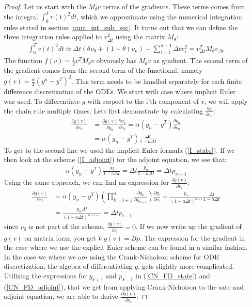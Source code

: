 \begin{proof}
Let us start with the $M_{\theta}v$ terms of the gradients. These terms comes from the integral $\int_0^T v(t)^2dt$, which we approximate using the numerical integration rules stated in section \ref{num_int_sub_sec}. It turns out that we can define the three integration rules applied to $v_{\Delta t}^2$ using the matrix $M_{\theta}$:
\begin{align*}
\int_0^T v(t)^2dt\approx  \Delta t(\theta v_0 +(1-\theta)v_n) + \sum_{i=1}^{n-1} \Delta t v_i^2 = v_{\Delta t}^TM_{\theta} v_{\Delta t}
\end{align*} 
The function $f(v)=\frac{1}{2} v^TM_{\theta}v$ obviously has $M_{\theta}v$ as gradient. The second term of the gradient comes from the second term of the functional, namely $g(v)=\frac{\alpha}{2}(y^n -y^T)^2$. This term needs to be handled separately for each finite difference discretization of the ODEs. We start with case where implicit Euler was used. To differentiate $g$ with respect to the i'th component of $v$, we will apply the chain rule multiple times. Lets first demonstrate by calculating $\frac{\partial g}{\partial v_n}$:
\begin{align*}
\frac{\partial g(v)}{\partial v_n} &= \frac{\partial g(v)}{\partial y_n}\frac{\partial y_n}{\partial v_n} = \alpha(y_n -y^T)\frac{\partial y_n}{\partial v_n}\\
&= \alpha(y_n -y^T)\frac{\Delta t}{1-a\Delta t}
\end{align*}
To get to the second line we used the implicit Euler formula (\ref{I_state}). If we then look at the scheme (\ref{I_adjoint}) for the adjoint equation, we see that:
\begin{align*}
\alpha(y_n -y^T)\frac{\Delta t}{1-a\Delta t} = \Delta t\frac{p_n}{1-a\Delta t} = \Delta t p_{n-1}
\end{align*} 
Using the same approach, we can find an expression for $\frac{\partial g(v)}{\partial v_i}$: 
\begin{align*}
\frac{\partial g(v)}{\partial v_i} &= \alpha(y_n -y^T) (\prod_{k=i+1}^{n}\frac{\partial y_{k}}{\partial y_{k-1}}) \frac{\partial y_i}{\partial v_{i}} = \frac{p_n}{(1-a\Delta t)^{n-i}}\frac{\Delta t}{1-a\Delta t} \\
&= \frac{p_n\Delta t}{(1-a\Delta t)^{n-i+1}}=\Delta t p_{i-1}
\end{align*}
since $v_0$ is not part of the scheme, $\frac{\partial g(v)}{\partial v_0}=0$. If we now write up the gradient of $g(v)$ on matrix form, you get $\nabla g(v) = Bp$. The expression for the gradient in the case where we use the explicit Euler scheme can be found in a similar fashion. In the case we where we are using the Crank-Nicholson scheme for ODE discretization, the algebra of differentiating $g$, gets slightly more complicated. Utilizing the expressions for $y_{k+1}$ and $p_{k-1}$ in (\ref{CN_FD_state}) and (\ref{CN_FD_adjoint}), that we get from applying Crank-Nicholson to the sate and adjoint equation, we are able to derive $\frac{\partial g(v)}{\partial v_i}$:

\end{proof}
